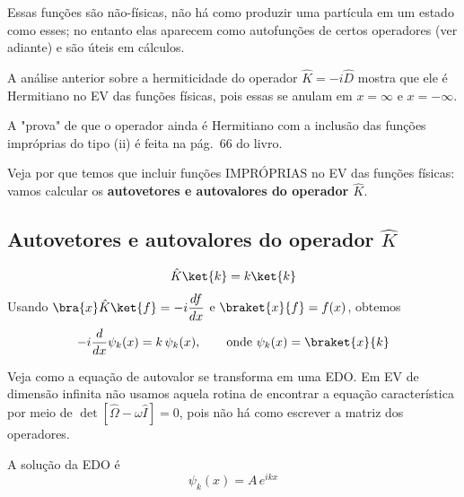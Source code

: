 Essas funções são não-físicas, não há como produzir uma partícula em um estado como esses; no entanto elas aparecem como autofunções de certos operadores (ver adiante) e são úteis em cálculos.

A análise anterior sobre a hermiticidade do operador $\hat{K} = -i\hat{D}$ mostra que ele é Hermitiano no EV das funções físicas, pois essas se anulam em $x=\infty$ e $x=-\infty$.

A "prova" de que o operador ainda é Hermitiano com a inclusão das funções impróprias do tipo (ii) é feita na pág.\ 66 do livro.

Veja por que temos que incluir funções IMPRÓPRIAS no EV das funções físicas: vamos calcular os \textbf{autovetores e autovalores do operador $\hat{K}$}.

\subsection*{Autovetores e autovalores do operador $\hat{K}$}

\begin{equation}
\hat{K}\ket{k} = k\ket{k}
\label{eq:aula7_K_autovalor}
\end{equation}
Usando $\bra{x}\hat{K}\ket{f} = -i\dfrac{df}{dx}$ e $\braket{x}{f} = f(x)$, obtemos
\begin{equation}
-i\frac{d}{dx}\psi_k(x) = k\,\psi_k(x), \qquad \text{onde } \psi_k(x) = \braket{x}{k}
\label{eq:aula7_K_edo}
\end{equation}

Veja como a equação de autovalor se transforma em uma EDO. Em EV de dimensão infinita não usamos aquela rotina de encontrar a equação característica por meio de $\det[\hat{\Omega} - \omega \hat{I}] = 0$, pois não há como escrever a matriz dos operadores.

A solução da EDO é
\begin{equation}
\psi_k(x) = A\, e^{ikx}
\label{eq:aula7_K_solucao}
\end{equation}


